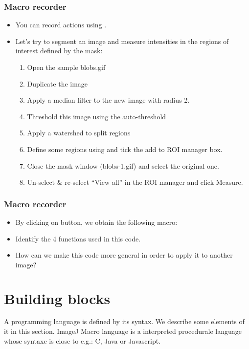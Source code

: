 \begin{frame}
  \frametitle{Macro recorder}
  \begin{itemize}
  \item You can record actions using .
  \item Let's try to segment an image and measure intensities in the
    regions of interest defined by the mask:
    \begin{enumerate}
    \item Open the sample blobs.gif 
    \item Duplicate the image 
    \item Apply a median filter to the new image  with radius 2.
    \item Threshold this image using the auto-threshold 
    \item Apply a watershed to split regions 
    \item Define some regions using  and tick the add to ROI manager box.
    \item Close the mask window (blobs-1.gif) and select the original one.
    \item Un-select \& re-select ``View all'' in the ROI manager and click Measure.
    \end{enumerate}
  \end{itemize}
\end{frame}

\begin{frame}[fragile]
  \frametitle<presentation>{Macro recorder}
  \begin{itemize}
  \item By clicking on  button, we obtain the following
    macro:\par
    
  \item Identify the 4 functions used in this code.
  \item How can we make this code more general in order to apply it to
    another image?
  \end{itemize}
\end{frame}

\section{Building blocks}
A programming language is defined by its syntax. We describe some
elements of it in this section. ImageJ Macro language is a interpreted
procedurale language whose syntaxe is close to e.g.: C, Java or
Javascript.

